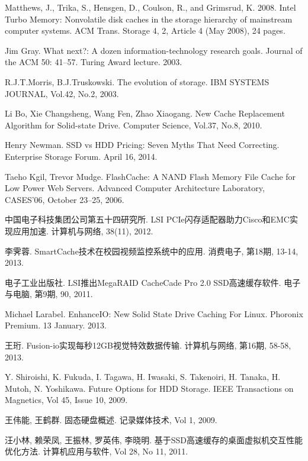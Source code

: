 ﻿\begin{thebibliography}

Matthews, J., Trika, S., Hensgen, D., Coulson, R., and Grimsrud, K. 2008. Intel Turbo Memory: Nonvolatile disk caches in the storage hierarchy of mainstream computer systems. ACM Trans. Storage 4, 2, Article 4 (May 2008), 24 pages.

Jim Gray. What next?: A dozen information-technology research goals. Journal of the ACM 50: 41–57. Turing Award lecture. 2003.

R.J.T.Morris, B.J.Truskowski. The evolution of storage. IBM SYSTEMS JOURNAL, Vol.42, No.2, 2003.

Li Bo, Xie Changsheng, Wang Fen, Zhao Xiaogang. New Cache Replacement Algorithm for Solid-state Drive. Computer Science, Vol.37, No.8, 2010.

Henry Newman. SSD vs HDD Pricing: Seven Myths That Need Correcting. Enterprise Storage Forum. April 16, 2014.

Taeho Kgil, Trevor Mudge. FlashCache: A NAND Flash Memory File Cache for Low Power Web Servers. Advanced Computer Architecture Laboratory, CASES’06, October 23–25, 2006.

中国电子科技集团公司第五十四研究所. LSI PCIe闪存适配器助力Cisco和EMC实现应用加速. 计算机与网络, 38(11), 2012.

李霁蓉. SmartCache技术在校园视频监控系统中的应用. 消费电子, 第18期, 13-14, 2013.

电子工业出版社. LSI推出MegaRAID CacheCade Pro 2.0 SSD高速缓存软件. 电子与电脑, 第9期, 90, 2011.

Michael Larabel. EnhanceIO: New Solid State Drive Caching For Linux. Phoronix Premium. 13 January. 2013.

王珩. Fusion-io实现每秒12GB视觉特效数据传输. 计算机与网络, 第16期, 58-58, 2013.

Y. Shiroishi, K. Fukuda, I. Tagawa, H. Iwasaki,  S. Takenoiri, H. Tanaka, H. Mutoh, N. Yoshikawa. Future Options for HDD Storage. IEEE Transactions on Magnetics, Vol 45, Issue 10, 2009.

王伟能, 王鹤群. 固态硬盘概述. 记录媒体技术, Vol 1, 2009.

汪小林, 赖荣凤, 王振林, 罗英伟, 李晓明. 基于SSD高速缓存的桌面虚拟机交互性能优化方法. 计算机应用与软件, Vol 28, No 11, 2011.


\end{thebibliography}
